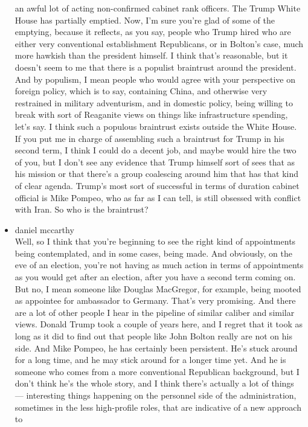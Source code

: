 \begin{itemize}
  an awful lot of acting non-confirmed cabinet rank officers. The Trump
  White House has partially emptied. Now, I'm sure you're glad of some
  of the emptying, because it reflects, as you say, people who Trump
  hired who are either very conventional establishment Republicans, or
  in Bolton's case, much more hawkish than the president himself. I
  think that's reasonable, but it doesn't seem to me that there is a
  populist braintrust around the president. And by populism, I mean
  people who would agree with your perspective on foreign policy, which
  is to say, containing China, and otherwise very restrained in military
  adventurism, and in domestic policy, being willing to break with sort
  of Reaganite views on things like infrastructure spending, let's say.
  I think such a populous braintrust exists outside the White House. If
  you put me in charge of assembling such a braintrust for Trump in his
  second term, I think I could do a decent job, and maybe would hire the
  two of you, but I don't see any evidence that Trump himself sort of
  sees that as his mission or that there's a group coalescing around him
  that has that kind of clear agenda. Trump's most sort of successful in
  terms of duration cabinet official is Mike Pompeo, who as far as I can
  tell, is still obsessed with conflict with Iran. So who is the
  braintrust?
\item
  daniel mccarthy\\
  Well, so I think that you're beginning to see the right kind of
  appointments being contemplated, and in some cases, being made. And
  obviously, on the eve of an election, you're not having as much action
  in terms of appointments as you would get after an election, after you
  have a second term coming on. But no, I mean someone like Douglas
  MacGregor, for example, being mooted as appointee for ambassador to
  Germany. That's very promising. And there are a lot of other people I
  hear in the pipeline of similar caliber and similar views. Donald
  Trump took a couple of years here, and I regret that it took as long
  as it did to find out that people like John Bolton really are not on
  his side. And Mike Pompeo, he has certainly been persistent. He's
  stuck around for a long time, and he may stick around for a longer
  time yet. And he is someone who comes from a more conventional
  Republican background, but I don't think he's the whole story, and I
  think there's actually a lot of things --- interesting things
  happening on the personnel side of the administration, sometimes in
  the less high-profile roles, that are indicative of a new approach to

\end{itemize}
